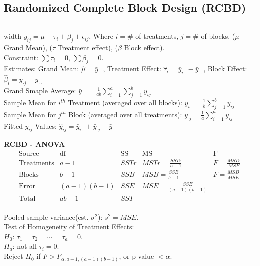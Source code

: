 \documentclass[10pt]{article}
\begin{document}
\subsection*{Randomized Complete Block Design (RCBD)}
\hrule width \textwidth
\vspace{6pt}
$y_{ij} = \mu + \tau_i + \beta_j +\epsilon_{ij}$, Where $i = $\# of treatments, $j = $\# of blocks. ($\mu$ Grand Mean), ($\tau$ Treatment effect), ($\beta$ Block effect). \\
Constraint: $\sum \tau_i = 0$, $\sum \beta_j = 0$. \\
Estimates: Grand Mean: $\hat{\mu} = \bar{y}_{\cdot \cdot}$, Treatment Effect: $\hat{\tau}_i = \bar{y}_{i \cdot} - \bar{y}_{\cdot \cdot}$, Block Effect: $\hat{\beta}_i = \bar{y}_{\cdot j} - \bar{y}_{\cdot \cdot}$\\
Grand Smaple Average: $\bar{y}_{\cdot \cdot} = \frac{1}{ab}\sum_{i=1}^{a} \sum_{j=1}^{b} y_{ij}$\\
Sample Mean for $i^{th}$ Treatment (averaged over all blocks): $\bar{y}_{i \cdot} = \frac{1}{b} \sum_{j=1}^{b} y_{ij}$\\
Sample Mean for $j^{th}$ Block (averaged over all treatments): $\bar{y}_{\cdot j} = \frac{1}{a} \sum_{i=1}^{a} y_{ij}$\\
Fitted $y_{ij}$ Values: $\hat{y}_{ij}=\bar{y}_{i \cdot} + \bar{y}_{\cdot j} - \bar{y}_{\cdot \cdot}$
\begin{multicols}{2}
  \begin{flushleft}
    \textbf{RCBD - ANOVA}
    \begin{equation*}
    \begin{array}{c|c|c|c|c}
      \text{Source} & \text{df} & \text{SS} & \text{MS} & \text{F}\\
        \hline
        \text{Treatments} & a - 1 & SSTr & MSTr = \frac{SSTr}{a-1} & F= \frac{MSTr}{MSE}\\
        \text{Blocks} & b - 1 & SSB & MSB = \frac{SSB}{b-1} & F= \frac{MSB}{MSE}\\
        \text{Error} & (a-1)(b-1) & SSE & MSE = \frac{SSE}{(a-1)(b-1)} & \\
        \hline
        \text{Total} & ab - 1 & SST & &\\
    \end{array}
  \end{equation*}
  \end{flushleft}

    \begin{flushright}
      Pooled sample variance(est. $\sigma^2$): $s^2 = MSE$. \\
      Test of Homogeneity of Treatment Effects: \\
      $H_0$: $\tau_1 = \tau_2 = \cdots = \tau_a = 0$. \\
      $H_a$: not all $\tau_i = 0$. \\
      Reject $H_0$ if $F > F_{\alpha, a-1, (a-1)(b-1)}$, or p-value $< \alpha$. \\
    \end{flushright}
  \end{multicols}
\end{document}

